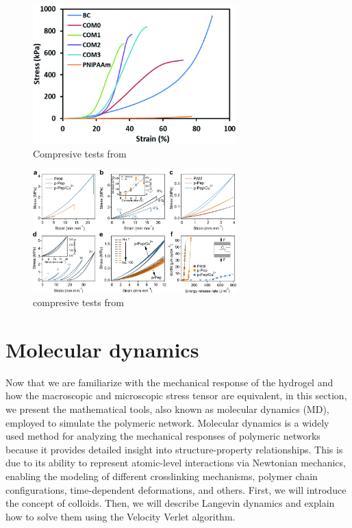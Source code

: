 \begin{figure}[ht!]
    \centering
    \includegraphics[width=0.7\textwidth]{figs/mechResponse/7.png}
    \caption{Compresive tests from\citep{wangRapidUniaxialActuation2018}}
\end{figure}

\begin{figure}[ht!]
    \centering
    \includegraphics[width=0.7\textwidth]{figs/mechResponse/8.png}
    \caption{compresive tests from\citep{xuestrongtoughrapidrecovery2023}}
\end{figure}

\section{Molecular dynamics}

Now that we are familiarize with the mechanical response of the hydrogel and how the macroscopic and microscopic stress tensor are equivalent, in this section, we present the mathematical tools, also known as molecular dynamics (MD), employed to simulate the polymeric network.
Molecular dynamics is a widely used method for analyzing the mechanical responses of polymeric networks because it provides detailed insight into structure-property relationships.
This is due to its ability to represent atomic-level interactions via Newtonian mechanics, enabling the modeling of different crosslinking mechanisms, polymer chain configurations, time-dependent deformations, and others.
First, we will introduce the concept of colloids. 
Then, we will describe Langevin dynamics and explain how to solve them using the Velocity Verlet algorithm.


